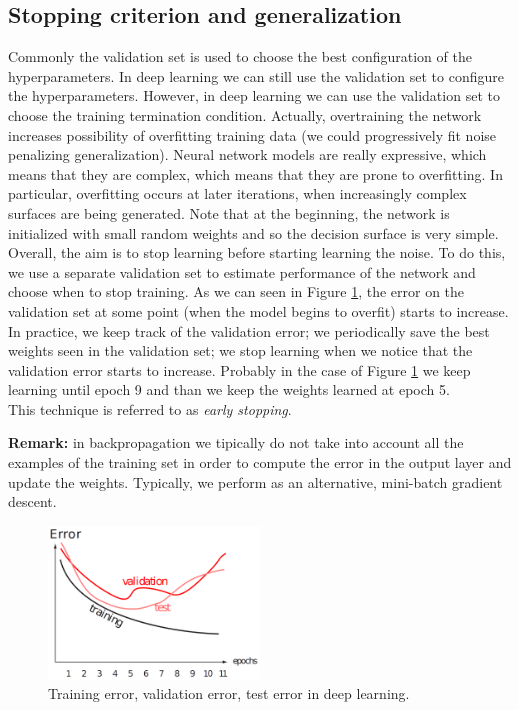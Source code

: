 \subsection{Stopping criterion and generalization}
Commonly the validation set is used to choose the best configuration of the hyperparameters. In deep learning we can still use the validation set to configure the hyperparameters. However, in deep learning we can use the validation set to choose the training termination condition. Actually, overtraining the network increases possibility of overfitting training data (we could progressively fit noise penalizing generalization). Neural network models are really expressive, which means that they are complex, which means that they are prone to overfitting. In particular, overfitting occurs at later iterations, when increasingly complex surfaces are being generated. Note that at the beginning, the network is initialized with small random weights and so the decision surface is very simple. Overall, the aim is to stop learning before starting learning the noise. To do this, we use a separate validation set to estimate performance of the network and choose when to stop training. As we can seen in Figure \ref{fig:deep_training_test_valudation}, the error on the validation set at some point (when the model begins to overfit) starts to increase. In practice, we keep track of the validation error; we periodically save the best weights seen in the validation set; we stop learning when we notice that the validation error starts to increase. Probably in the case of Figure \ref{fig:deep_training_test_valudation} we keep learning until epoch 9 and than we keep the weights learned at epoch 5.\\ This technique is referred to as \textit{early stopping}. \newline

\textbf{Remark:} in backpropagation we tipically do not take into account all the examples of the training set in order to compute the error in the output layer and update the weights. Typically, we perform as an alternative, mini-batch gradient descent.

\begin{figure}
    \centering
    \includegraphics[width=0.5\textwidth]{images/deep_training_test_valudation.png}
    \caption{Training error, validation error, test error in deep learning.}
    \label{fig:deep_training_test_valudation}
\end{figure}

